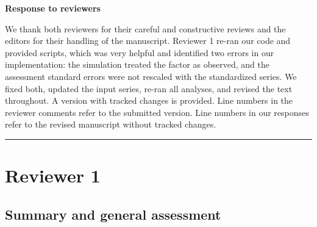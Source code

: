 \documentclass[11pt]{article}
\begin{document}
\begin{center}
{\Large\bfseries Response to reviewers}
\end{center}

We thank both reviewers for their careful and constructive reviews and the editors for their handling of the manuscript.
Reviewer 1 re-ran our code and provided scripts, which was very helpful
and identified two errors in our implementation: the simulation treated
the factor as observed, and the assessment standard errors were not
rescaled with the standardized series. We fixed both, updated the input
series, re-ran all analyses, and revised the text throughout. A version
with tracked changes is provided. Line numbers in the reviewer comments
refer to the submitted version. Line numbers in our responses refer to
the revised manuscript without tracked changes.

\begin{center}\rule{0.5\linewidth}{0.5pt}\end{center}

\section{Reviewer 1}\label{reviewer-1}

\subsection{Summary and general
assessment}\label{summary-and-general-assessment}
\end{document}
